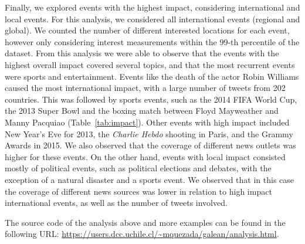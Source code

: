 Finally, we explored events with the highest impact, considering international
and local events.  
%
For this analysis, we considered all international events (regional and global).
%
We counted the number of different interested locations for each event, however
only considering interest measurements within the 99-th percentile of the
dataset.
%
From this analysis we were able to observe that the events with the highest
overall impact covered several topics, and that the most recurrent events were
sports and entertainment.  
%
Events like the death of the actor Robin Williams caused the most international
impact, with a large number of tweets from 202 countries.  
%
This was followed by sports events, such as the 2014 FIFA World Cup, the 2013
Super Bowl and the boxing match between Floyd Mayweather and Manny Pacquiao
(Table~\ref{tab:impact}).
%
Other events with high impact included New Year's Eve for 2013, the
\emph{Charlie Hebdo} shooting in Paris, and the Grammy Awards in 2015.  
%
We also observed that the coverage of different news outlets was higher for
these events.
%
On the other hand, events with local impact consisted mostly of political
events, such as political elections and debates, with the exception of a natural
disaster and a sports event.
%
We observed that in this case the coverage of different news sources was lower
in relation to high impact international events, as well as the number of tweets
involved.


The source code of the analysis above and more examples can be found in the
following URL: \url{https://users.dcc.uchile.cl/~mquezada/galean/analysis.html}.
